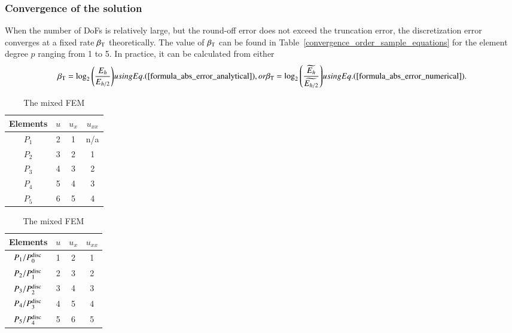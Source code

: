 \documentclass[review,3p]{elsarticle}
\makeatletter
\newcommand*{\rom}[1]{\expandafter\@slowromancap\romannumeral #1@}
\makeatother
\begin{document}
\subsubsection{Convergence of the solution}

When the number of DoFs is relatively large, but the round-off error does not exceed the truncation error, the discretization error converges at a fixed rate $\beta_{\rm T}$ theoretically\cite[Theorem~5.\rom{1}]{gockenbach2006understanding}. The value of $\beta_{\rm T}$ can be found in Table~\ref{convergence_order_sample_equations} for the element degree $p$ ranging from 1 to 5. In practice, it can be calculated from either 
\begin{subequations}	\label{formula_order_of_convergence}
\begin{align}
 \beta_{\rm T}=\log _2 \left( \frac{E_{h}}{E_{h/2}} \right)
\end{align}
using Eq. (\ref{formula_abs_error_analytical}), or
\begin{align}
 \beta_{\rm T}=\log _2 \left( \frac{\widetilde {E_{h}}}{\widetilde {E_{h/2}}} \right)		\label{formula_order_of_convergence_finer_solution}
\end{align}
using Eq. (\ref{formula_abs_error_numerical}).
\end{subequations}

\begin{table}[!ht]
\caption[sss]{Order of convergence for $u$, $u_{x}$ and $u_{xx}$.}
\label{convergence_order_sample_equations}
\hspace{0.7cm}
\begin{subtable}{0.5\textwidth}
\caption[sss]{The standard FEM}
\label{convergence_order_sample_equations_std}
\centering
 \begin{tabular}{c c c c} \hline
Elements & $u$ & $u_{x}$ & $u_{xx}$  \\	\hline
$P_1$ & 2 & 1 & n/a \\
$P_2$ & 3 & 2 & 1 \\ 
$P_3$ & 4 & 3 & 2 \\ 
$P_4$ & 5 & 4 & 3 \\ 
$P_5$ & 6 & 5 & 4 \\ \hline
\end{tabular}
\end{subtable}\hspace{-2.0cm}
\begin{subtable}{0.5\textwidth}
\centering
\caption[sss]{The mixed FEM}
\label{convergence_order_sample_equations_mix}
 \begin{tabular}{c c c c} \hline 
Elements & $u$ & $u_{x}$ & $u_{xx}$  \\	\hline
$P_1/P_0^{\rm disc}$ & 1 & 2 & 1 \\
$P_2/P_1^{\rm disc}$ & 2 & 3 & 2 \\
$P_3/P_2^{\rm disc}$ & 3 & 4 & 3 \\
$P_4/P_3^{\rm disc}$ & 4 & 5 & 4 \\
$P_5/P_4^{\rm disc}$ & 5 & 6 & 5 \\	\hline
\end{tabular}
\end{subtable}
\end{table}
\end{document}
